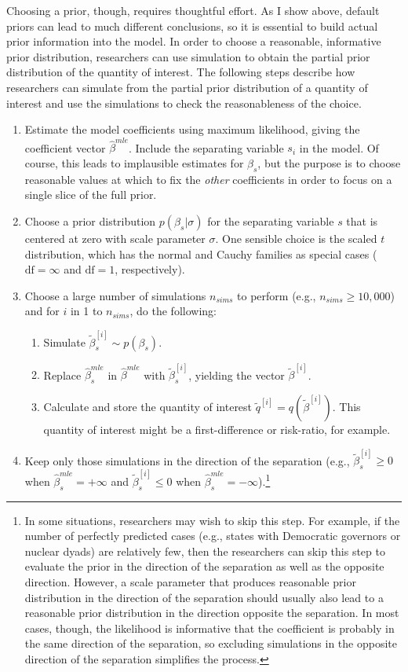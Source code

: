 \documentclass[12pt]{article}
\begin{document}
Choosing a prior, though, requires thoughtful effort. 
As I show above, default priors can lead to much different conclusions, so it is essential to build actual prior information into the model. 
In order to choose a reasonable, informative prior distribution, researchers can use simulation to obtain the partial prior distribution of the quantity of interest.
The following steps describe how researchers can simulate from the partial prior distribution of a quantity of interest and use the simulations to check the reasonableness of the choice.
\begin{enumerate}
\item Estimate the model coefficients using maximum likelihood, giving the coefficient vector $\hat{\beta}^{mle}$. 
Include the separating variable $s_i$ in the model. 
Of course, this leads to implausible estimates for $\beta_s$, but the purpose is to choose reasonable values at which to fix the \emph{other} coefficients in order to focus on a single slice of the full prior. 
\item Choose a prior distribution $p(\beta_s | \sigma)$ for the separating variable $s$ that is centered at zero with scale parameter $\sigma$. 
One sensible choice is the scaled $t$ distribution, which has the normal and Cauchy families as special cases ($\text{df} = \infty$ and $\text{df} = 1$, respectively). 
\item Choose a large number of simulations $n_{sims}$ to perform (e.g., $n_{sims} \geq 10,000$) and for $i$ in 1 to $n_{sims}$, do the following:
	\begin{enumerate}
	\item Simulate $\tilde{\beta}^{[i]}_s \sim p(\beta_s)$.
	\item Replace $\hat{\beta}_s^{mle}$ in $\hat{\beta}^{mle}$ with $\tilde{\beta}^{[i]}_s$, yielding the vector $\tilde{\beta}^{[i]}$.
	\item Calculate and store the quantity of interest $\tilde{q}^{[i]} = q\left(\tilde{\beta}^{[i]}\right)$. 
	This quantity of interest might be a first-difference or risk-ratio, for example.
	\end{enumerate}
\item Keep only those simulations in the direction of the separation (e.g., $\tilde{\beta}_s^{[i]} \geq 0$ when $\hat{\beta}_{s}^{mle} = +\infty$ and $\tilde{\beta}_s^{[i]} \leq 0$ when $\hat{\beta}_{s}^{mle} = -\infty$).\footnote{In some situations, researchers may wish to skip this step. For example, if the number of perfectly predicted cases (e.g., states with Democratic governors or nuclear dyads) are relatively few, then the researchers can skip this step to evaluate the prior in the direction of the separation as well as the opposite direction. However, a scale parameter that produces reasonable prior distribution in the direction of the separation should usually also lead to a reasonable prior distribution in the direction opposite the separation. In most cases, though, the likelihood is informative that the coefficient is probably in the same direction of the separation, so excluding simulations in the opposite direction of the separation simplifies the process.}

\end{enumerate}
\end{document}
